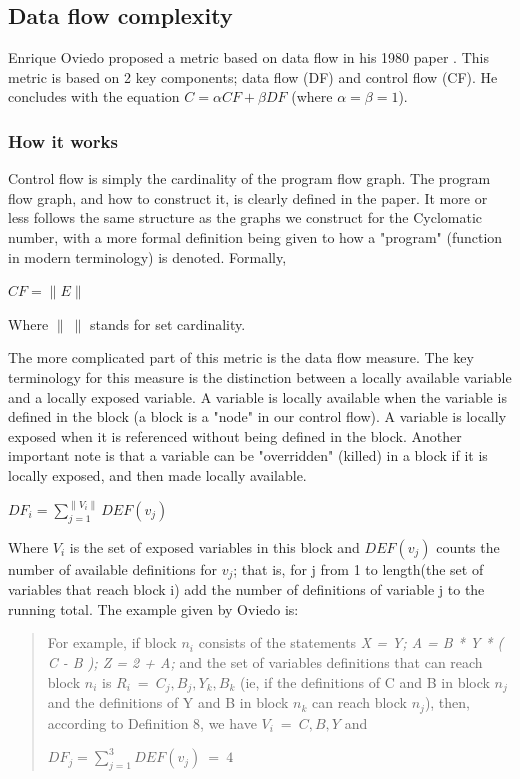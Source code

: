 \documentclass[]{article}
\begin{document}
\subsection{Data flow complexity}

Enrique Oviedo proposed a metric based on data flow in his 1980 paper \cite{ref:oviedo1993control}.
This metric is based on 2 key components; data flow (DF) and control flow (CF).
He concludes with the equation $C = \alpha CF + \beta DF$ (where $\alpha=\beta=1$).


\subsubsection{How it works}

Control flow is simply the cardinality of the program flow graph.
The program flow graph, and how to construct it, is clearly defined in the paper.
It more or less follows the same structure as the graphs we construct for the Cyclomatic number, with a more formal definition being given to how a "program" (function in modern terminology) is denoted.
Formally,

$CF=\parallel E\parallel$

Where $\parallel ~\parallel$ stands for set cardinality.

The more complicated part of this metric is the data flow measure.
The key terminology for this measure is the distinction between a locally available variable and a locally exposed variable.
A variable is locally available when the variable is defined in the block (a block is a "node" in our control flow).
A variable is locally exposed when it is referenced without being defined in the block.
Another important note is that a variable can be "overridden" (killed) in a block if it is locally exposed, and then made locally available.

$DF_i = \sum\limits_{j=1}^{\parallel V_i \parallel} DEF(v_j)$

Where $V_i$ is the set of exposed variables in this block and $DEF(v_j)$ counts the number of available definitions for $v_j$; that is, for j from 1 to length(the set of variables that reach block i) add the number of definitions of variable j to the running total.
The example given by Oviedo is:
\begin{quotation}
	For example, if block $n_i$ consists of the statements \textit{X = Y; A = B * Y * ( C - B ); Z = 2 + A;} and the set of variables definitions that can reach block $n_i$ is $R_i ~= ~{C_j, B_j, Y_k, B_k}$ (ie, if the definitions of C and B in block $n_j$ and the definitions of Y and B in block $n_k$ can reach block $n_j$), then, according to Definition 8, we have $V_i ~= ~{C,B,Y}$ and
	
	$DF_j = \sum\limits_{j=1}^{3} DEF(v_j)~=~4$ \cite{ref:oviedo1993control}
\end{quotation}
\end{document}
